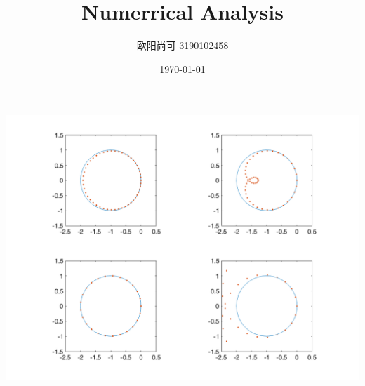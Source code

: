 \documentclass{article}
\title{Numerrical Analysis}
\author{欧阳尚可  3190102458}
\date{\today}
\begin{document}
\maketitle

\newpage


\includegraphics[scale = 0.25]{Ex34.png}\\
\end{document}
